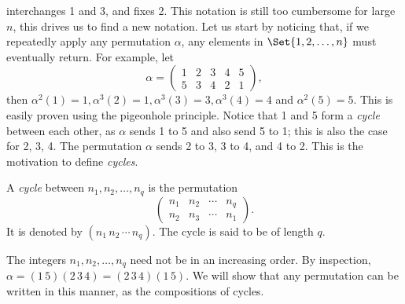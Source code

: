 \documentclass[main.tex]{subfiles}
\begin{document}
				interchanges 1 and 3, and fixes 2. This notation is still too cumbersome for large $n$, this drives us to find a new notation. Let us start by noticing that, if we repeatedly apply any permutation $\alpha$, any elements in $\Set{1, 2, \ldots, n}$ must eventually return. For example, let
				\begin{equation*}
				\alpha = \begin{pmatrix}
				1 & 2 & 3 & 4 & 5\\
				5 & 3 & 4 & 2 & 1
				\end{pmatrix},
				\end{equation*}
				then $\alpha^2(1) = 1, \alpha^3(2) = 1, \alpha^3(3) = 3, \alpha^3(4) = 4$ and $\alpha^2(5) = 5$. This is easily proven using the pigeonhole principle. Notice that 1 and 5 form a \textit{cycle} between each other, as $\alpha$ sends 1 to 5 and also send 5 to 1; this is also the case for 2, 3, 4. The permutation $\alpha$ sends 2 to 3, 3 to 4, and 4 to 2. This is the motivation to define \textit{cycles}.
				\begin{definition}
					A \textit{cycle} between $n_1, n_2, \ldots, n_q$ is the permutation
					\begin{equation*}
					\begin{pmatrix}
					n_1 & n_2 & \cdots & n_q \\
					n_2 & n_3 & \cdots & n_1
					\end{pmatrix}.
					\end{equation*}
					It is denoted by $(n_1\,n_2\,\cdots\,n_q)$. The cycle is said to be of length $q$.
				\end{definition}
				The integers $n_1, n_2, \ldots, n_q$ need not be in an increasing order. By inspection, $\alpha = (1\,5)(2\, 3\,4) = (2\,3\,4)(1\,5)$. We will show that any permutation can be written in this manner, as the compositions of cycles.
				
\end{document}
